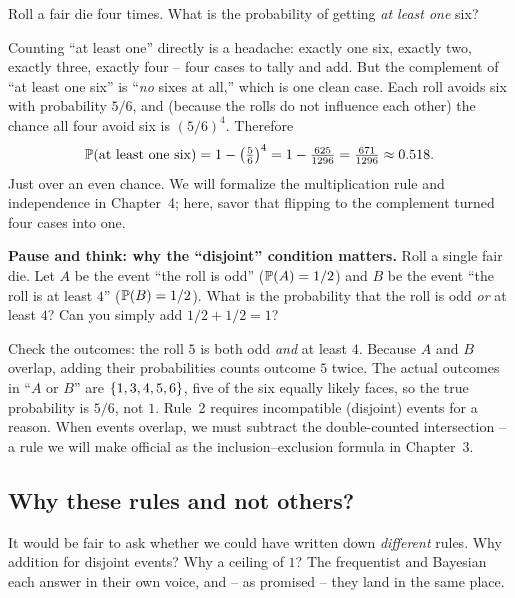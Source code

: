 \begin{example}
\label{ch01:ex-complement}
Roll a fair die four times. What is the probability of getting \emph{at least one}
six?

Counting ``at least one'' directly is a headache: exactly one six, exactly two,
exactly three, exactly four -- four cases to tally and add. But the complement of
``at least one six'' is ``\emph{no} sixes at all,'' which is one clean case. Each
roll avoids six with probability $5/6$, and (because the rolls do not influence
each other) the chance all four avoid six is $(5/6)^4$. Therefore
\[
  \P(\text{at least one six}) = 1 - \left(\tfrac{5}{6}\right)^4
  = 1 - \tfrac{625}{1296} = \tfrac{671}{1296} \approx 0.518.
\]
Just over an even chance. We will formalize the multiplication rule and
independence in Chapter~4; here, savor that flipping to the complement
turned four cases into one.
\end{example}

\begin{walkbox}
\textbf{Pause and think: why the ``disjoint'' condition matters.}
Roll a single fair die. Let $A$ be the event ``the roll is odd'' ($\P(A) = 1/2$)
and $B$ be the event ``the roll is at least $4$'' ($\P(B) = 1/2$). What is the
probability that the roll is odd \emph{or} at least $4$? Can you simply add
$1/2 + 1/2 = 1$?

Check the outcomes: the roll $5$ is both odd \emph{and} at least $4$. Because
$A$ and $B$ overlap, adding their probabilities counts outcome $5$ twice. The
actual outcomes in ``$A$ or $B$'' are $\set{1, 3, 4, 5, 6}$, five of the six
equally likely faces, so the true probability is $5/6$, not $1$. Rule~2 requires
incompatible (disjoint) events for a reason. When events overlap, we must
subtract the double-counted intersection -- a rule we will make official as the
inclusion--exclusion formula in Chapter~3.
\end{walkbox}

\subsection{Why these rules and not others?}
\label{ch01:why-these}

It would be fair to ask whether we could have written down \emph{different} rules.
Why addition for disjoint events? Why a ceiling of $1$? The frequentist and
Bayesian each answer in their own voice, and -- as promised -- they land in the
same place.

